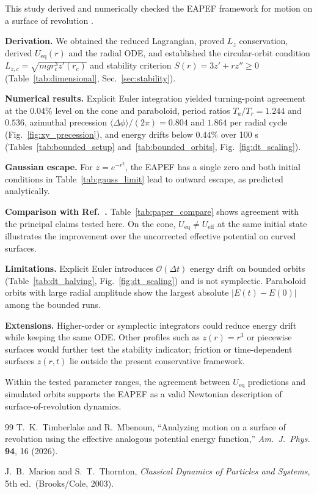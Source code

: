 \documentclass[11pt,letterpaper]{article}
\newcommand{\parhead}[1]{\par\medskip\noindent\textbf{#1}\ignorespaces}
\begin{document}
This study derived and numerically checked the EAPEF framework for motion on a surface of revolution \cite{ajp2026}.

\parhead{Derivation.}
We obtained the reduced Lagrangian, proved $L_z$ conservation, derived $U_{\mathrm{eq}}(r)$ and the radial ODE, and established the circular-orbit condition $L_{z,c}=\sqrt{mgr_c^3 z'(r_c)}$ and stability criterion $S(r)=3z'+rz''\ge 0$ (Table~\ref{tab:dimensional}, Sec.~\ref{sec:stability}).

\parhead{Numerical results.}
Explicit Euler integration yielded turning-point agreement at the 0.04\% level on the cone and paraboloid, period ratios $T_a/T_r=1.244$ and $0.536$, azimuthal precession $\langle\Delta\phi\rangle/(2\pi)=0.804$ and $1.864$ per radial cycle (Fig.~\ref{fig:xy_precession}), and energy drifts below $0.44\%$ over 100 s (Tables~\ref{tab:bounded_setup} and~\ref{tab:bounded_orbits}, Fig.~\ref{fig:dt_scaling}).

\parhead{Gaussian escape.}
For $z=e^{-r^2}$, the EAPEF has a single zero and both initial conditions in Table~\ref{tab:gauss_limit} lead to outward escape, as predicted analytically.

\parhead{Comparison with Ref.~\cite{ajp2026}.}
Table~\ref{tab:paper_compare} shows agreement with the principal claims tested here. On the cone, $U_{\mathrm{eq}}\ne U_{\mathrm{eff}}$ at the same initial state illustrates the improvement over the uncorrected effective potential on curved surfaces.

\parhead{Limitations.}
Explicit Euler introduces $\mathcal{O}(\Delta t)$ energy drift on bounded orbits (Table~\ref{tab:dt_halving}, Fig.~\ref{fig:dt_scaling}) and is not symplectic. Paraboloid orbits with large radial amplitude show the largest absolute $|E(t)-E(0)|$ among the bounded runs.

\parhead{Extensions.}
Higher-order or symplectic integrators could reduce energy drift while keeping the same ODE. Other profiles such as $z(r)=r^3$ or piecewise surfaces would further test the stability indicator; friction or time-dependent surfaces $z(r,t)$ lie outside the present conservative framework.

Within the tested parameter ranges, the agreement between $U_{\mathrm{eq}}$ predictions and simulated orbits supports the EAPEF as a valid Newtonian description of surface-of-revolution dynamics.

\begin{thebibliography}{99}
T.~K.~Timberlake and R.~Mbenoun,
``Analyzing motion on a surface of revolution using the effective analogous potential energy function,''
\textit{Am.\ J.\ Phys.} \textbf{94}, 16 (2026).

J.~B.~Marion and S.~T.~Thornton,
\textit{Classical Dynamics of Particles and Systems}, 5th ed.\ (Brooks/Cole, 2003).
\end{thebibliography}
\end{document}
